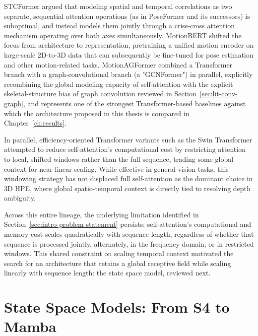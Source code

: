 STCFormer \cite{tang2023stcformer} argued that modeling spatial and
temporal correlations as two separate, sequential attention operations
(as in PoseFormer and its successors) is suboptimal, and instead models
them jointly through a criss-cross attention mechanism operating over both
axes simultaneously. MotionBERT \cite{zhu2023motionbert} shifted the focus
from architecture to representation, pretraining a unified motion encoder
on large-scale 2D-to-3D data that can subsequently be fine-tuned for pose
estimation and other motion-related tasks. MotionAGFormer
\cite{mehraban2024motionagformer} combined a Transformer branch with a
graph-convolutional branch (a "GCNFormer") in parallel, explicitly
recombining the global modeling capacity of self-attention with the
explicit skeletal-structure bias of graph convolution reviewed in
Section~\ref{sec:lit-conv-graph}, and represents one of the strongest
Transformer-based baselines against which the architecture proposed in
this thesis is compared in Chapter~\ref{ch:results}.

In parallel, efficiency-oriented Transformer variants such as the Swin
Transformer \cite{liu2021swin} attempted to reduce self-attention's
computational cost by restricting attention to local, shifted windows
rather than the full sequence, trading some global context for
near-linear scaling. While effective in general vision tasks, this
windowing strategy has not displaced full self-attention as the dominant
choice in 3D HPE, where global spatio-temporal context is directly tied to
resolving depth ambiguity.

Across this entire lineage, the underlying limitation identified in
Section~\ref{sec:intro-problem-statement} persists: self-attention's
computational and memory cost scales quadratically with sequence length,
regardless of whether that sequence is processed jointly, alternately, in
the frequency domain, or in restricted windows. This shared constraint on
scaling temporal context motivated the search for an architecture that
retains a global receptive field while scaling linearly with sequence
length: the state space model, reviewed next.

\section{State Space Models: From S4 to Mamba}
\label{sec:lit-ssm-foundations}

